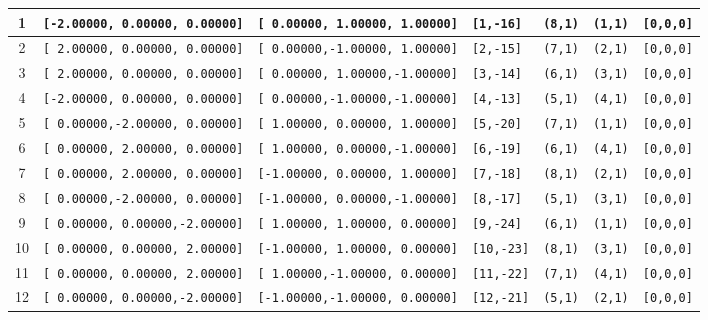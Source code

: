 \documentclass[fleqn,10pt,landscape]{jsarticle}
\begin{document}
\begin{longtable}[l]{cllllll}
1 & \texttt{[-2.00000, 0.00000, 0.00000]} & \texttt{[ 0.00000, 1.00000, 1.00000]} & \texttt{[1,-16]} & \texttt{(8,1)} & \texttt{(1,1)} & \texttt{[0,0,0]} \\ \hline
2 & \texttt{[ 2.00000, 0.00000, 0.00000]} & \texttt{[ 0.00000,-1.00000, 1.00000]} & \texttt{[2,-15]} & \texttt{(7,1)} & \texttt{(2,1)} & \texttt{[0,0,0]} \\ \hline
3 & \texttt{[ 2.00000, 0.00000, 0.00000]} & \texttt{[ 0.00000, 1.00000,-1.00000]} & \texttt{[3,-14]} & \texttt{(6,1)} & \texttt{(3,1)} & \texttt{[0,0,0]} \\ \hline
4 & \texttt{[-2.00000, 0.00000, 0.00000]} & \texttt{[ 0.00000,-1.00000,-1.00000]} & \texttt{[4,-13]} & \texttt{(5,1)} & \texttt{(4,1)} & \texttt{[0,0,0]} \\ \hline
5 & \texttt{[ 0.00000,-2.00000, 0.00000]} & \texttt{[ 1.00000, 0.00000, 1.00000]} & \texttt{[5,-20]} & \texttt{(7,1)} & \texttt{(1,1)} & \texttt{[0,0,0]} \\ \hline
6 & \texttt{[ 0.00000, 2.00000, 0.00000]} & \texttt{[ 1.00000, 0.00000,-1.00000]} & \texttt{[6,-19]} & \texttt{(6,1)} & \texttt{(4,1)} & \texttt{[0,0,0]} \\ \hline
7 & \texttt{[ 0.00000, 2.00000, 0.00000]} & \texttt{[-1.00000, 0.00000, 1.00000]} & \texttt{[7,-18]} & \texttt{(8,1)} & \texttt{(2,1)} & \texttt{[0,0,0]} \\ \hline
8 & \texttt{[ 0.00000,-2.00000, 0.00000]} & \texttt{[-1.00000, 0.00000,-1.00000]} & \texttt{[8,-17]} & \texttt{(5,1)} & \texttt{(3,1)} & \texttt{[0,0,0]} \\ \hline
9 & \texttt{[ 0.00000, 0.00000,-2.00000]} & \texttt{[ 1.00000, 1.00000, 0.00000]} & \texttt{[9,-24]} & \texttt{(6,1)} & \texttt{(1,1)} & \texttt{[0,0,0]} \\ \hline
10 & \texttt{[ 0.00000, 0.00000, 2.00000]} & \texttt{[-1.00000, 1.00000, 0.00000]} & \texttt{[10,-23]} & \texttt{(8,1)} & \texttt{(3,1)} & \texttt{[0,0,0]} \\ \hline
11 & \texttt{[ 0.00000, 0.00000, 2.00000]} & \texttt{[ 1.00000,-1.00000, 0.00000]} & \texttt{[11,-22]} & \texttt{(7,1)} & \texttt{(4,1)} & \texttt{[0,0,0]} \\ \hline
12 & \texttt{[ 0.00000, 0.00000,-2.00000]} & \texttt{[-1.00000,-1.00000, 0.00000]} & \texttt{[12,-21]} & \texttt{(5,1)} & \texttt{(2,1)} & \texttt{[0,0,0]} \\
\end{longtable}
\end{document}

